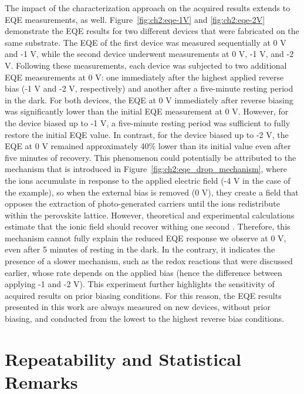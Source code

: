 The impact of the characterization approach on the acquired results extends to EQE measurements, as well. Figure~\ref{fig:ch2:eqe-1V} and \ref{fig:ch2:eqe-2V} demonstrate the EQE results for two different devices that were fabricated on the same substrate. The EQE of the first device was measured sequentially at 0 V and -1 V, while the second device underwent measurements at 0 V, -1 V, and -2 V. Following these measurements, each device was subjected to two additional EQE measurements at 0 V: one immediately after the highest applied reverse bias (-1 V and -2 V, respectively) and another after a five-minute resting period in the dark. For both devices, the EQE at 0 V immediately after reverse biasing was significantly lower than the initial EQE measurement at 0 V. However, for the device biased up to -1 V, a five-minute resting period was sufficient to fully restore the initial EQE value. In contrast, for the device biased up to -2 V, the EQE at 0 V remained approximately 40\% lower than its initial value even after five minutes of recovery. This phenomenon could potentially be attributed to the mechanism that is introduced in Figure~\ref{fig:ch2:eqe_drop_mechanism}, where the ions accumulate in response to the applied electric field (-4 V in the case of the example), so when the external bias is removed (0 V), they create a field that opposes the extraction of photo-generated carriers until the ions redistribute within the perovskite lattice. However, theoretical and experimental calculations estimate that the ionic field should recover withing one second \cite{Bowring2018ReverseCells}. Therefore, this mechanism cannot fully explain the reduced EQE response we observe at 0 V, even after 5 minutes of resting in the dark. In the contrary, it indicates the presence of a slower mechanism, such as the redox reactions that were discussed earlier, whose rate depends on the applied bias (hence the difference between applying -1 and -2 V). This experiment further highlights the sensitivity of acquired results on prior biasing conditions. For this reason, the EQE results presented in this work are always measured on new devices, without prior biasing, and conducted from the lowest to the highest reverse bias conditions.

\section{Repeatability and Statistical Remarks}

